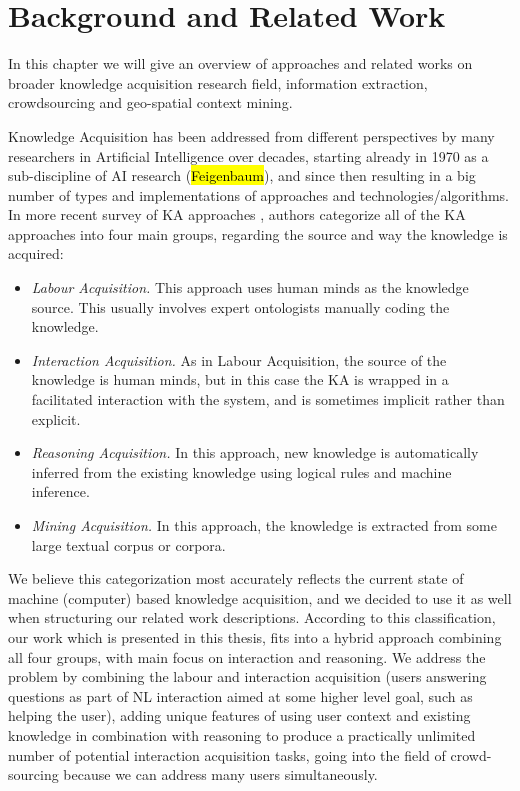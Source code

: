 \chapter{Background and Related Work}

In this chapter we will give an overview of approaches and related works on broader knowledge acquisition research field, information extraction, crowdsourcing and geo-spatial context mining. 

Knowledge Acquisition has been addressed from different perspectives by many researchers in Artificial Intelligence over decades, starting already in 1970 as a sub-discipline of AI research (\hl{Feigenbaum}), and since then resulting in a big number of types and implementations of approaches and technologies/algorithms. In more recent survey of KA approaches \parencite{Zang2013}, authors categorize all of the KA approaches into four main groups, regarding the source and way the knowledge is acquired:
\begin{itemize}
	\item \emph{Labour Acquisition.} This approach uses human minds as the knowledge source. This usually involves expert ontologists manually coding the knowledge.
	\item \emph{Interaction Acquisition.} As in Labour Acquisition, the source of the knowledge is human minds, but in this case the KA is wrapped in a facilitated interaction with the system, and is sometimes implicit rather than explicit.
	\item \emph{Reasoning Acquisition.} In this approach, new knowledge is automatically inferred from the existing knowledge using logical rules and machine inference.
	\item \emph{Mining Acquisition.} In this approach, the knowledge is extracted from some large textual corpus or corpora.
\end{itemize}

We believe this categorization most accurately reflects the current state of machine (computer) based knowledge acquisition, and we decided to use it as well when structuring our related work descriptions. According to this classification, our work which is presented in this thesis, fits into a hybrid approach combining all four groups, with main focus on interaction and reasoning. We address the problem by combining the labour and interaction acquisition (users answering questions as part of NL interaction aimed at some higher level goal, such as helping the user), adding unique features of using user context and existing knowledge in combination with reasoning to produce a practically unlimited number of potential interaction acquisition tasks, going into the field of crowd-sourcing because we can address many users simultaneously.